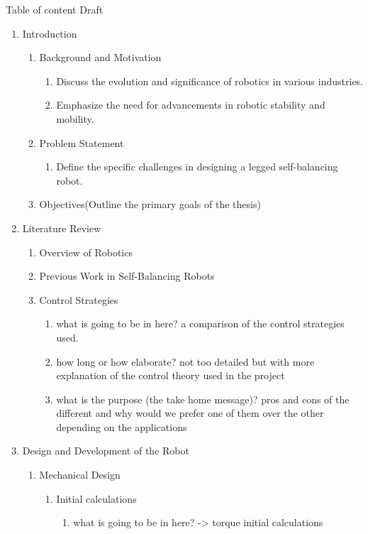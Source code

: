Table of content Draft
\begin{enumerate}
	\item Introduction
	\begin{enumerate}
		\item Background and Motivation
		\begin{enumerate}
			\item Discuss the evolution and significance of robotics in various industries.
			\item Emphasize the need for advancements in robotic stability and mobility.
		\end{enumerate}
		
		\item Problem Statement
		\begin{enumerate}
			\item Define the specific challenges in designing a legged self-balancing robot.
		\end{enumerate}
		\item Objectives(Outline the primary goals of the thesis)
	\end{enumerate}
	\item Literature Review
	\begin{enumerate}
		\item Overview of Robotics
		\item Previous Work in Self-Balancing Robots
		\item Control Strategies 
		\begin{enumerate}
			\item what is going to be in here? a comparison of the control strategies used.
			\item how long or how elaborate? not too detailed but with more explanation of the control theory used in the project
			\item what is the purpose (the take home message)? pros and cons of the different and why would we prefer one of them over the other depending on the applications
		\end{enumerate}
	\end{enumerate}
	\item Design and Development of the Robot
	\begin{enumerate}
		\item Mechanical Design
		\begin{enumerate}
			\item Initial calculations 
			\begin{enumerate}
				\item what is going to be in here? -> torque initial calculations

\end{enumerate}
\end{enumerate}
\end{enumerate}
\end{enumerate}
